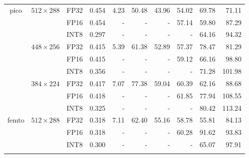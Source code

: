 \begin{appendices}
\begin{table}[h]
\begin{tabular}{|c|c|c|c|rrrrrr|}
        \hline
        \multirow{9}{*}{pico}                                     & \multirow{3}{*}{$512 \times 288$} & FP32 & 0.454 &  4.23 &  50.48 & 43.96 & 54.02 & 69.78 &  71.11 \\
                                                                  &                                   & FP16 & 0.454 &     - &      - &     - & 57.14 & 59.80 &  87.29 \\
                                                                  &                                   & INT8 & 0.297 &     - &      - &     - &     - & 64.16 &  94.32 \\
        \cline{2-10}
                                                                  & \multirow{3}{*}{$448 \times 256$} & FP32 & 0.415 &  5.39 &  61.38 & 52.89 & 57.37 & 78.47 &  81.29 \\
                                                                  &                                   & FP16 & 0.415 &     - &      - &     - & 59.12 & 66.16 &  98.80 \\
                                                                  &                                   & INT8 & 0.356 &     - &      - &     - &     - & 71.28 & 101.98 \\
        \cline{2-10}
                                                                  & \multirow{3}{*}{$384 \times 224$} & FP32 & 0.417 &  7.07 &  77.38 & 59.04 & 60.39 & 62.16 &  88.68 \\
                                                                  &                                   & FP16 & 0.418 &     - &      - &     - & 61.85 & 77.94 & 108.55 \\
                                                                  &                                   & INT8 & 0.325 &     - &      - &     - &     - & 80.42 & 113.24 \\
        \hline
        \multirow{12}{*}{femto}                                   & \multirow{3}{*}{$512 \times 288$} & FP32 & 0.318 &  7.11 &  62.40 & 55.16 & 58.78 & 55.81 &  84.13 \\
                                                                  &                                   & FP16 & 0.318 &     - &      - &     - & 60.28 & 91.62 &  93.83 \\
                                                                  &                                   & INT8 & 0.300 &     - &      - &     - &     - & 65.07 &  97.91 \\
        \cline{2-10}

\end{tabular}
\end{table}
\end{appendices}
